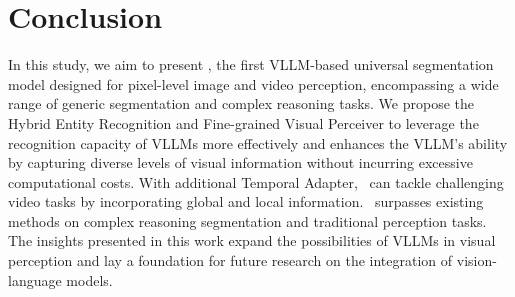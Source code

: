 \begin{table}[t]
  \centering
  \caption{ Ablation on the temporal adapter for video tasks, including global prompt aggregation (global) and local space-time information injection (local).
  }

\vspace{-3mm}
  
\label{tab:ab-temporal}
\end{table}

\section{Conclusion}
In this study, we aim to present \name, the first VLLM-based universal segmentation model designed for pixel-level image and video perception, encompassing a wide range of generic segmentation and complex reasoning tasks.
We propose the Hybrid Entity Recognition and Fine-grained Visual Perceiver to leverage the recognition capacity of VLLMs more effectively and enhances the VLLM's ability by capturing diverse levels of visual information without incurring excessive computational costs. With additional Temporal Adapter, \name~can tackle challenging video tasks by incorporating global and local information. \name~surpasses existing methods on complex reasoning segmentation and traditional perception tasks. The insights presented in this work expand the possibilities of VLLMs in visual perception and lay a foundation for future research on the integration of vision-language models.
{
    \small
        }

\clearpage
\setcounter{page}{1}
\maketitlesupplementary
\appendix

